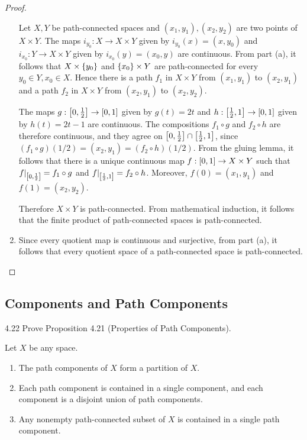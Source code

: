 \begin{proof}
\begin{enumerate}[label={(\alph*)}]
		      Let $X, Y$ be path-connected spaces and $(x_{1}, y_{1}), (x_{2}, y_{2})$ are two points of $X\times Y$. The maps $i_{y_{0}}: X\to X\times Y$ given by $i_{y_{0}}(x) = (x, y_{0})$ and $i_{x_{0}}: Y\to X\times Y$ given by $i_{x_{0}}(y) = (x_{0}, y)$ are continuous. From part (a), it follows that $X\times\set{y_{0}}$ and $\set{x_{0}}\times Y$ are path-connected for every $y_{0} \in Y, x_{0}\in X$. Hence there is a path $f_{1}$ in $X\times Y$ from $(x_{1}, y_{1})$ to $(x_{2}, y_{1})$ and a path $f_{2}$ in $X\times Y$ from $(x_{2}, y_{1})$ to $(x_{2}, y_{2})$.

		      The maps $g: \closedinterval{0, \frac{1}{2}} \to \closedinterval{0, 1}$ given by $g(t) = 2t$ and $h: \closedinterval{\frac{1}{2}, 1} \to \closedinterval{0, 1}$ given by $h(t) = 2t - 1$ are continuous. The compositions $f_{1}\circ g$ and $f_{2}\circ h$ are therefore continuous, and they agree on $\closedinterval{0, \frac{1}{2}} \cap \closedinterval{\frac{1}{2}, 1}$, since $(f_{1}\circ g)(1/2) = (x_{2}, y_{1}) = (f_{2}\circ h)(1/2)$. From the gluing lemma, it follows that there is a unique continuous map $f: \closedinterval{0, 1} \to X\times Y$ such that $f\vert_{\closedinterval{0, \frac{1}{2}}} = f_{1}\circ g$ and $f\vert_{\closedinterval{\frac{1}{2}, 1}} = f_{2}\circ h$. Moreover, $f(0) = (x_{1}, y_{1})$ and $f(1) = (x_{2}, y_{2})$.

		      Therefore $X\times Y$ is path-connected. From mathematical induction, it follows that the finite product of path-connected spaces is path-connected.
		\item Since every quotient map is continuous and surjective, from part (a), it follows that every quotient space of a path-connected space is path-connected.
	\end{enumerate}
\end{proof}

\subsection*{Components and Path Components}

\begin{exercise}{4.22}
	Prove Proposition 4.21 (Properties of Path Components).

	Let $X$ be any space.
	\begin{enumerate}[label={(\alph*)}]
		\item The path components of $X$ form a partition of $X$.
		\item Each path component is contained in a single component, and each component is a disjoint union of path components.
		\item Any nonempty path-connected subset of $X$ is contained in a single path component.
	\end{enumerate}
\end{exercise}

